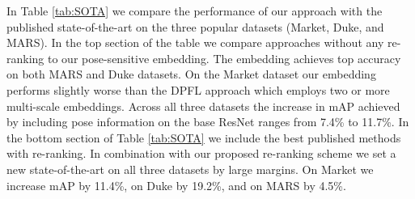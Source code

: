 \documentclass[10pt,twocolumn,letterpaper]{article}
\begin{document}
In Table \ref{tab:SOTA} we compare the performance of our approach with the published state-of-the-art on the three popular datasets (Market, Duke, and MARS). In the top section of the table we compare approaches without any re-ranking to our pose-sensitive embedding. The embedding achieves top accuracy on both MARS and Duke datasets. On the Market dataset our embedding performs slightly worse than the DPFL \cite{DPFL} approach which employs two or more multi-scale embeddings. Across all three datasets the increase in mAP achieved by including pose information on the base ResNet 
ranges from 7.4\% to 11.7\%. In the bottom section of Table \ref{tab:SOTA} we include the best published methods with re-ranking. In combination with our proposed re-ranking scheme we set a new state-of-the-art on all three datasets by large margins. On Market we increase mAP by 11.4\%, on Duke by 19.2\%, and on MARS by 4.5\%.
\end{document}
